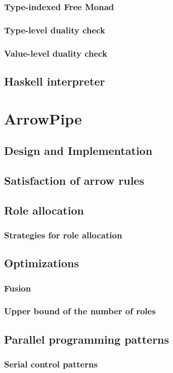 \documentclass[a4paper, twoside]{report}
\begin{document}
\subsection{Type-indexed Free Monad}
\subsection{Type-level duality check}
\subsection{Value-level duality check}
\section{Haskell interpreter}

\chapter{ArrowPipe}
\section{Design and Implementation}
\section{Satisfaction of arrow rules}
\section{Role allocation}
\subsection{Strategies for role allocation}
\section{Optimizations}
\subsection{Fusion}
\subsection{Upper bound of the number of roles}
\section{Parallel programming patterns}
\subsection{Serial control patterns}
\end{document}

